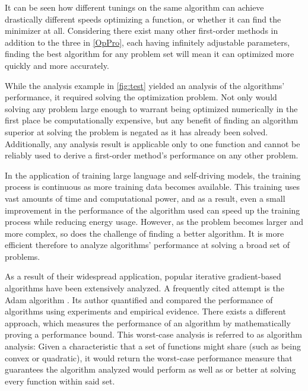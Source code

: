 
It can be seen how different tunings on the same algorithm can achieve drastically different speeds optimizing a function, or whether it can find the minimizer at all. Considering there exist many other first-order methods in addition to the three in \cref{OpPro}, each having infinitely adjustable parameters, finding the best algorithm for any problem set will mean it can optimized more quickly and more accurately.

While the analysis example in \cref{fig:test} yielded an analysis of the algorithms' performance, it required solving the optimization problem. Not only would solving any problem large enough to warrant being optimized numerically in the first place be computationally expensive, but any benefit of finding an algorithm superior at solving the problem is negated as it has already been solved. Additionally, any analysis result is applicable only to one function and cannot be reliably used to derive a first-order method's performance on any other problem.

In the application of training large language and self-driving models, the training process is continuous as more training data becomes available. This training uses vast amounts of time and computational power, and as a result, even a small improvement in the performance of the algorithm used can speed up the training process while reducing energy usage. However, as the problem becomes larger and more complex, so does the challenge of finding a better algorithm. It is more efficient therefore to analyze algorithms' performance at solving a broad set of problems.

As a result of their widespread application, popular iterative gradient-based algorithms have been extensively analyzed. A frequently cited attempt is the Adam algorithm \cite{adam}. Its author quantified and compared the performance of algorithms using experiments and empirical evidence. There exists a different approach, which measures the performance of an algorithm by mathematically proving a performance bound. This worst-case analysis is referred to as algorithm analysis: Given a characteristic that a set of functions might share (such as being convex or quadratic), it would return the worst-case performance measure that guarantees the algorithm analyzed would perform as well as or better at solving every function within said set.

